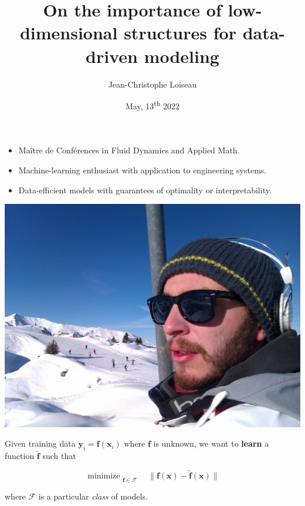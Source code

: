 \documentclass[aspectratio=169, usenames, dvipsnames]{beamer}
\title{On the importance of low-dimensional structures for data-driven modeling}
\author[JC]{Jean-Christophe Loiseau}
\date[]{May, 13\textsuperscript{th} 2022}
\DeclareMathOperator*{\minimize}{minimize~}
\begin{document}
\begin{frame}
  \titlepage
\end{frame}


\begin{frame}
  \vfill
  \begin{minipage}{.68\textwidth}
    \begin{itemize}
    \item Maître de Conférences in Fluid Dynamics and Applied Math.

      \bigskip

    \item Machine-learning enthusiast with application to engineering systems.

      \bigskip

    \item Data-efficient models with guarantees of optimality or interpretability.
    \end{itemize}
  \end{minipage}%
  \hfill
  \begin{minipage}{.28\textwidth}
    \includegraphics[width=\textwidth]{myself}
  \end{minipage}

  \vfill
\end{frame}

\begin{frame}
  \vfill

  Given training data $\bm{y}_i = \bm{f}(\bm{x}_i)$ where $\bm{f}$ is unknown, we want to \textbf{learn} a function $\hat{\bm{f}}$ such that

  \bigskip
{\Large
  \[
  \minimize_{\hat{\bm{f}} \in \mathcal{F}} \quad \| \bm{f}(\bm{x}) - \hat{\bm{f}}(\bm{x}) \|
  \]
}

  \bigskip

  where $\mathcal{F}$ is a particular \emph{class} of models.

  \vfill
\end{frame}
\end{document}
